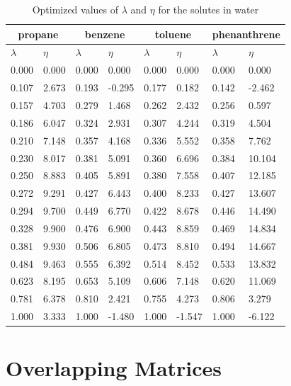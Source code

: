 \documentclass[
	12pt,				%
	openany,			%
	oneside,			%
	a4paper,			%
	english,			%
	brazil				%
	]{abntex2}
\begin{document}
\begin{apendicesenv}
\begin{table}[h]
	\centering
	\caption{Optimized values of $\lambda$ and $\eta$ for the solutes in water }
	\begin{tabular}{llllllll}
		\hline
		\multicolumn{2}{c}{propane}& \multicolumn{2}{c}{benzene}& \multicolumn{2}{c}{toluene}& \multicolumn{2}{c}{phenanthrene}\\
		\hline
		$\lambda$ & $\eta$ & $\lambda$ & $\eta$  & $\lambda$ & $\eta$  & $\lambda$ & $\eta$ \\ 
		\hline
0.000	&	0.000	&	0.000	&	0.000	&	0.000	&	0.000	&	0.000	&	0.000	\\
0.107	&	2.673	&	0.193	&	-0.295	&	0.177	&	0.182	&	0.142	&	-2.462	\\
0.157	&	4.703	&	0.279	&	1.468	&	0.262	&	2.432	&	0.256	&	0.597	\\
0.186	&	6.047	&	0.324	&	2.931	&	0.307	&	4.244	&	0.319	&	4.504	\\
0.210	&	7.148	&	0.357	&	4.168	&	0.336	&	5.552	&	0.358	&	7.762	\\
0.230	&	8.017	&	0.381	&	5.091	&	0.360	&	6.696	&	0.384	&	10.104	\\
0.250	&	8.883	&	0.405	&	5.891	&	0.380	&	7.558	&	0.407	&	12.185	\\
0.272	&	9.291	&	0.427	&	6.443	&	0.400	&	8.233	&	0.427	&	13.607	\\
0.294	&	9.700	&	0.449	&	6.770	&	0.422	&	8.678	&	0.446	&	14.490	\\
0.328	&	9.900	&	0.476	&	6.900	&	0.443	&	8.859	&	0.469	&	14.834	\\
0.381	&	9.930	&	0.506	&	6.805	&	0.473	&	8.810	&	0.494	&	14.667	\\
0.484	&	9.463	&	0.555	&	6.392	&	0.514	&	8.452	&	0.533	&	13.832	\\
0.623	&	8.195	&	0.653	&	5.109	&	0.606	&	7.148	&	0.620	&	11.069	\\
0.781	&	6.378	&	0.810	&	2.421	&	0.755	&	4.273	&	0.806	&	3.279	\\
1.000	&	3.333	&	1.000	&	-1.480	&	1.000	&	-1.547	&	1.000	&	-6.122	\\


		\hline
	\end{tabular}
\end{table}
\chapter{Overlapping Matrices}


\end{apendicesenv}
\end{document}
